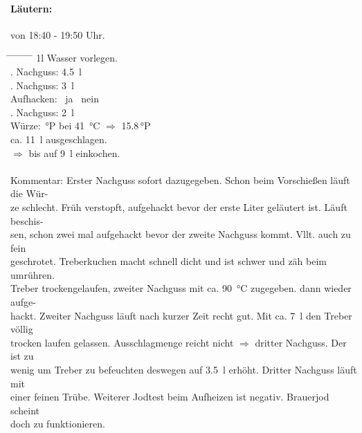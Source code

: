 \documentclass[12pt,oneside,a4paper]{scrartcl}
\begin{document}
\paragraph{Läutern:} von 18:40 - 19:50 Uhr.
	\begin{tabbing}
		\hspace{1cm} \= \hspace{1cm} \= \hspace{1cm} \= \hspace{1cm} \= \hspace{1cm} \=\hspace{1cm} \=\hspace{1cm} \=\hspace{1cm} \= \kill
		\> 1l Wasser vorlegen.\\
		\> . Nachguss: \> \> \> \SI{4,5}{\litre}\\
		\> . Nachguss: \> \> \> \SI{3}{\litre}\\
		\> \> \> Aufhacken: \> \> \CheckedBox \ ja \> \> \Square \ nein\\
		\> . Nachguss: \> \> \> \SI{2}{\litre}\\
		\> Würze: \> \> \,°P\> bei \> \SI{41}{\celsius} \> $\Rightarrow$ \> \num{15,8}\,°P\\
		\> \> \> ca. \SI{11}{\litre} ausgeschlagen.\\
		\> \> \> $\Rightarrow$ bis auf \SI{9}{\litre} einkochen.\\ \\
		\> Kommentar: \>\>\>Erster Nachguss sofort dazugegeben. Schon beim Vorschießen läuft die Wür-\\
		\>\>\>ze schlecht. Früh verstopft, aufgehackt bevor der erste Liter geläutert ist. Läuft beschis-\\
		\>\>\>sen, schon zwei mal aufgehackt bevor der zweite Nachguss kommt. Vllt. auch zu fein\\
		\>\>\>geschrotet. Treberkuchen macht schnell dicht und ist schwer und zäh beim umrühren.\\
		\>\>\>Treber trockengelaufen, zweiter Nachguss mit ca. \SI{90}{\celsius} zugegeben. dann wieder aufge-\\
		\>\>\>hackt. Zweiter Nachguss läuft nach kurzer Zeit recht gut. Mit ca. \SI{7}{\litre} den Treber völlig\\
		\> \> \>trocken laufen gelassen. Ausschlagmenge reicht nicht $\Rightarrow$ dritter Nachguss. Der ist zu \\
		\> \> \>wenig um Treber zu befeuchten deswegen auf \SI{3,5}{\litre} erhöht. Dritter Nachguss läuft mit\\
		\> \> \>einer feinen Trübe. Weiterer Jodtest beim Aufheizen ist negativ. Brauerjod scheint\\
		\> \> \>doch zu funktionieren.\\
	\end{tabbing}
\end{document}
